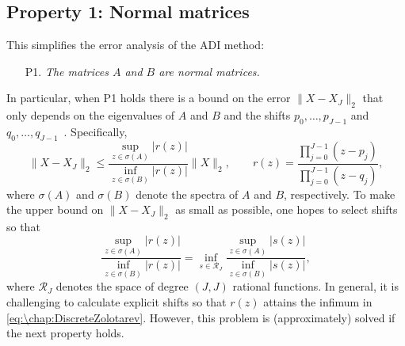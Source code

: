 \subsection*{Property 1: Normal matrices} 
This simplifies the error analysis of the ADI method:
\vspace{1em}
\begin{enumerate}
\item[P1.] \emph{The matrices $A$ and $B$ are normal matrices.}
\end{enumerate}
\vspace{1em}
In particular, when P1 holds there is a bound on the error $\|X-X_J\|_2$ that only depends on the eigenvalues of $A$ and $B$ and the shifts $p_0,\ldots,p_{J-1}$ and $q_0,\ldots,q_{J-1}$~\cite{Benner_09_01}. Specifically,
\[
\|X-X_J\|_2 \leq \frac{\sup_{z\in\sigma(A)} \left|r(z)\right|}{\inf_{z\in\sigma(B)} \left|r(z)\right|}\|X\|_2, \qquad r(z) = \frac{\prod_{j=0}^{J-1}(z-p_j)}{\prod_{j=0}^{J-1} (z-q_j)},
\]
where $\sigma(A)$ and $\sigma(B)$ denote the spectra of $A$ and $B$, respectively.
To make the upper bound on $\|X-X_J\|_2$ as small as possible, one hopes to select shifts so that
\begin{equation}
\frac{\sup_{z\in\sigma(A)} \left|r(z)\right|}{\inf_{z\in\sigma(B)} \left|r(z)\right|} = \inf_{s\in\mathcal{R}_{J}} \frac{\sup_{z\in\sigma(A)} \left|s(z)\right|}{\inf_{z\in\sigma(B)} \left|s(z)\right|},
\label{eq:\chap:DiscreteZolotarev}
\end{equation}
where $\mathcal{R}_{J}$ denotes the space of degree $(J,J)$ rational functions. In general, it is challenging to calculate explicit shifts so that $r(z)$ attains the infimum in \cref{eq:\chap:DiscreteZolotarev}. However, this problem is (approximately) solved if the next property holds. 

